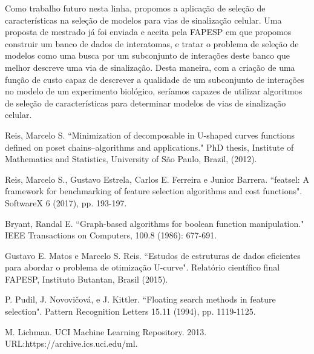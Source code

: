 \documentclass[12pt]{article}
\begin{document}
Como trabalho futuro nesta linha, propomos a aplicação de seleção de
características na seleção de modelos para vias de sinalização celular.
Uma proposta de mestrado já foi enviada e aceita pela FAPESP em que 
propomos construir um banco de dados de interatomas, e tratar o problema 
de seleção de modelos como uma busca por um subconjunto de interações 
deste banco que melhor descreve uma via de sinalização. Desta maneira,
com a criação de uma função de custo capaz de descrever a qualidade
de um subconjunto de interações no modelo de um experimento biológico,
seríamos capazes de utilizar algoritmos de seleção de características 
para determinar modelos de vias de sinalização celular.

\pagebreak
\begin{thebibliography}{9} \label{sec:referencias}


Reis, Marcelo S. ``Minimization of decomposable in U-shaped curves functions defined on poset chains–algorithms and applications." PhD thesis, Institute of Mathematics and Statistics, University of São Paulo, Brazil, (2012).

Reis, Marcelo S., Gustavo Estrela, Carlos E. Ferreira e Junior Barrera.
``featsel: A framework for benchmarking of feature selection algorithms
and cost functions". SoftwareX 6 (2017), pp. 193-197.

Bryant, Randal E. ``Graph-based algorithms for boolean function manipulation." IEEE Transactions on Computers, 100.8 (1986): 677-691. 

Gustavo E. Matos e Marcelo S. Reis. ``Estudos de estruturas de dados 
eficientes para abordar o problema de otimização U-curve". Relatório
científico final FAPESP, Instituto Butantan, Brasil (2015).

P. Pudil, J. Novovičová, e J. Kittler. ``Floating search methods in feature selection". 
Pattern Recognition Letters 15.11 (1994), pp. 1119-1125.


M. Lichman. UCI Machine Learning Repository. 2013. 
URL:https://archive.ics.uci.edu/ml.

\end{thebibliography}
\end{document}
